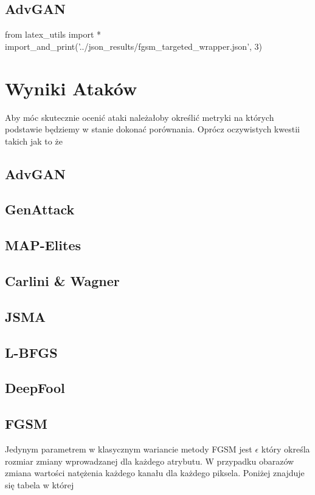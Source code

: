 \documentclass{article}
\begin{document}
\subsection{AdvGAN}
\begin{adjustbox}{max width=\textwidth}
\begin{pycode}
from latex_utils import *
import_and_print('../json_results/fgsm_targeted_wrapper.json', 3)
\end{pycode}
\end{adjustbox}

\section{Wyniki Ataków}\label{comparison}
    Aby móc skutecznie ocenić ataki należałoby określić metryki na których podstawie będziemy w stanie dokonać porównania.
    Oprócz oczywistych kwestii takich jak to że
\subsection{AdvGAN}
\subsection{GenAttack}
\subsection{MAP-Elites}
\subsection{Carlini \& Wagner}
\subsection{JSMA}
\subsection{L-BFGS}
\subsection{DeepFool}


\subsection{FGSM}
    Jedynym parametrem w klasycznym wariancie metody FGSM jest \(\epsilon\) który określa rozmiar zmiany wprowadzanej dla
    każdego atrybutu. W przypadku obarazów zmiana wartości natężenia każdego kanału dla każdego piksela. Poniżej znajduje
    się tabela w której
\end{document}
